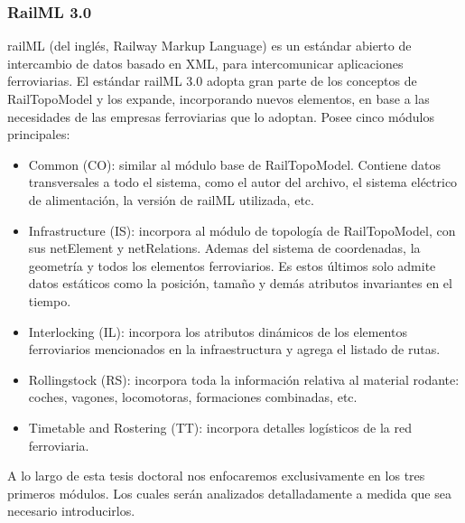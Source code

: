 \subsubsection{RailML 3.0}

    railML (del inglés, Railway Markup Language) es un estándar abierto de intercambio de datos basado en XML, para intercomunicar aplicaciones ferroviarias. El estándar railML 3.0 adopta gran parte de los conceptos de RailTopoModel y los expande, incorporando nuevos elementos, en base a las necesidades de las empresas ferroviarias que lo adoptan. Posee cinco módulos principales:

    \begin{itemize}
        \item Common (CO): similar al módulo base de RailTopoModel. Contiene datos transversales a todo el sistema, como el autor del archivo, el sistema eléctrico de alimentación, la versión de railML utilizada, etc.
        \item Infrastructure (IS): incorpora al módulo de topología de RailTopoModel, con sus netElement y netRelations. Ademas del sistema de coordenadas, la geometría y todos los elementos ferroviarios. Es estos últimos solo admite datos estáticos como la posición, tamaño y demás atributos invariantes en el tiempo.
        \item Interlocking (IL): incorpora los atributos dinámicos de los elementos ferroviarios mencionados en la infraestructura y agrega el listado de rutas.
        \item Rollingstock (RS): incorpora toda la información relativa al material rodante: coches, vagones, locomotoras, formaciones combinadas, etc.
        \item Timetable and Rostering (TT): incorpora detalles logísticos de la red ferroviaria.
    \end{itemize}

    A lo largo de esta tesis doctoral nos enfocaremos exclusivamente en los tres primeros módulos. Los cuales serán analizados detalladamente a medida que sea necesario introducirlos.